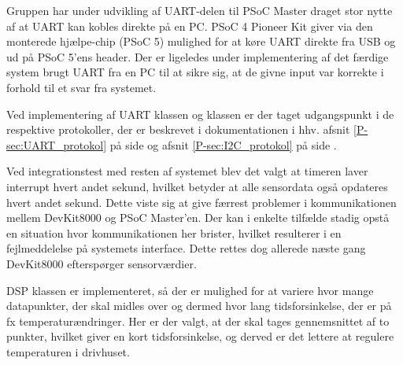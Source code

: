 \mbox{}

Gruppen har under udvikling af UART-delen til PSoC Master draget stor nytte af at UART kan kobles direkte på en PC. 
PSoC 4 Pioneer Kit giver via den monterede hjælpe-chip (PSoC 5) mulighed for at køre UART direkte fra USB og ud på PSoC 5'ens header.
Der er ligeledes under implementering af det færdige system brugt UART fra en PC til at sikre sig, at de givne input var korrekte i forhold til et svar fra systemet.

Ved implementering af UART klassen og \IIC klassen er der taget udgangspunkt i de respektive protokoller, der er beskrevet i dokumentationen i hhv. afsnit \ref{P-sec:UART_protokol}  på side \pageref{P-sec:UART_protokol} og afsnit \ref{P-sec:I2C_protokol}  på side \pageref{P-sec:I2C_protokol}.

\mbox{}

Ved integrationstest med resten af systemet blev det valgt at timeren laver interrupt hvert andet sekund, hvilket betyder at alle sensordata også opdateres hvert andet sekund. Dette viste sig at give færrest problemer i kommunikationen mellem DevKit8000 og PSoC Master'en. 
Der kan i enkelte tilfælde stadig opstå en situation hvor kommunikationen her brister, hvilket resulterer i en fejlmeddelelse på systemets interface. Dette rettes dog allerede næste gang DevKit8000 efterspørger sensorværdier.

DSP klassen er implementeret, så der er mulighed for at variere hvor mange datapunkter, der skal midles over og dermed hvor lang tidsforsinkelse, der er på fx temperaturændringer. Her er der valgt, at der skal tages gennemsnittet af to punkter, hvilket giver en kort tidsforsinkelse, og derved er det lettere at regulere temperaturen i drivhuset.

\clearpage
